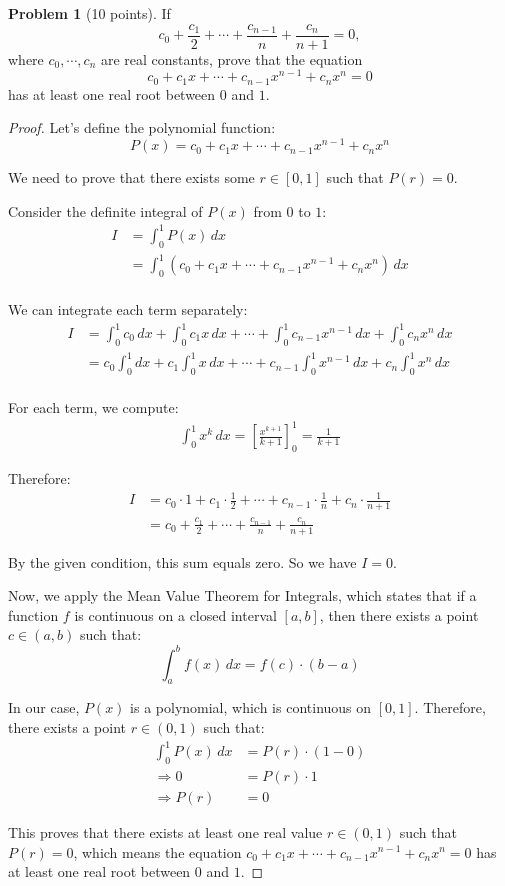 \documentclass[12pt,oneside]{article}
\theoremstyle{definition}
\newtheorem{problem}{Problem}
\begin{document}
\begin{problem}[10 points]
If
\[
c_0 + \frac{c_1}{2} + \cdots + \frac{c_{n-1}}{n} + \frac{c_n}{n+1} = 0,
\]
where $c_0, \cdots, c_n$ are real constants, 
prove that the equation 
\[
c_0 + c_1 x + \cdots + c_{n-1}x^{n-1} + c_n x^n = 0
\]
has at least one real root between $0$ and $1$. 
\end{problem}

\begin{proof}
Let's define the polynomial function:
\[
P(x) = c_0 + c_1 x + \cdots + c_{n-1}x^{n-1} + c_n x^n
\]

We need to prove that there exists some $r \in [0,1]$ such that $P(r) = 0$.

Consider the definite integral of $P(x)$ from $0$ to $1$:
\begin{align}
I &= \int_0^1 P(x) \, dx \\
&= \int_0^1 (c_0 + c_1 x + \cdots + c_{n-1}x^{n-1} + c_n x^n) \, dx \\
\end{align}

We can integrate each term separately:
\begin{align}
I &= \int_0^1 c_0 \, dx + \int_0^1 c_1 x \, dx + \cdots + \int_0^1 c_{n-1}x^{n-1} \, dx + \int_0^1 c_n x^n \, dx \\
&= c_0 \int_0^1 dx + c_1 \int_0^1 x \, dx + \cdots + c_{n-1} \int_0^1 x^{n-1} \, dx + c_n \int_0^1 x^n \, dx \\
\end{align}

For each term, we compute:
\begin{align}
\int_0^1 x^k \, dx = \left[ \frac{x^{k+1}}{k+1} \right]_0^1 = \frac{1}{k+1}
\end{align}

Therefore:
\begin{align}
I &= c_0 \cdot 1 + c_1 \cdot \frac{1}{2} + \cdots + c_{n-1} \cdot \frac{1}{n} + c_n \cdot \frac{1}{n+1} \\
&= c_0 + \frac{c_1}{2} + \cdots + \frac{c_{n-1}}{n} + \frac{c_n}{n+1}
\end{align}

By the given condition, this sum equals zero. So we have $I = 0$.

Now, we apply the Mean Value Theorem for Integrals, which states that if a function $f$ is continuous on a closed interval $[a,b]$, then there exists a point $c \in (a,b)$ such that:
\[
\int_a^b f(x) \, dx = f(c) \cdot (b-a)
\]

In our case, $P(x)$ is a polynomial, which is continuous on $[0,1]$. Therefore, there exists a point $r \in (0,1)$ such that:
\begin{align}
\int_0^1 P(x) \, dx &= P(r) \cdot (1-0) \\
\Rightarrow 0 &= P(r) \cdot 1 \\
\Rightarrow P(r) &= 0
\end{align}

This proves that there exists at least one real value $r \in (0,1)$ such that $P(r) = 0$, which means the equation $c_0 + c_1 x + \cdots + c_{n-1}x^{n-1} + c_n x^n = 0$ has at least one real root between $0$ and $1$.
\end{proof}
\end{document}
